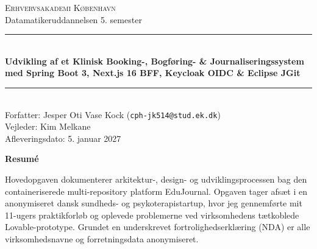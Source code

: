 \documentclass[11pt,a4paper]{article}
\begin{document}
\begin{titlepage}
    \centering
    \vspace*{0.8cm}
    {\Large \textsc{Erhvervsakademi København}}\\[0.3cm]
    {\large Datamatikeruddannelsen 5. semester}\\[0.9cm]

    \rule{\textwidth}{1.2pt}\\[0.45cm]
    {\LARGE \bfseries Udvikling af et Klinisk Booking-, Bogføring- \& Journaliseringssystem med Spring Boot 3, Next.js 16 BFF, Keycloak OIDC \& Eclipse JGit}\\[0.35cm]
    \rule{\textwidth}{1.2pt}\\[0.8cm]

    {\large
    Forfatter: Jesper Oti Vase Kock (\texttt{cph-jk514@stud.ek.dk})\\[0.2cm]
    Vejleder: Kim Melkane\\[0.2cm]
    Afleveringsdato: 5. januar 2027
    }\\[0.9cm]

    \begin{minipage}{0.92\textwidth}
        \begin{center}
            \textbf{\large Resumé}
        \end{center}
        \small
        Hovedopgaven dokumenterer arkitektur-, design- og udviklingsprocessen bag den containeriserede multi-repository platform EduJournal. Opgaven tager afsæt i en anonymiseret dansk sundheds- og psykoterapistartup, hvor jeg gennemførte mit 11-ugers praktikforløb og oplevede problemerne ved virksomhedens tætkoblede Lovable-prototype. Grundet en underskrevet fortrolighedserklæring (NDA) er alle virksomhedsnavne og forretningsdata anonymiseret.


\end{minipage}
\end{titlepage}
\end{document}
